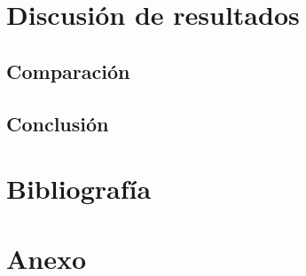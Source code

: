 \documentclass[titlepage]{article}
\begin{document}
\section{Discusión de resultados}
\subsection{Comparación}
\subsection{Conclusión}

\section{Bibliografía}

\section{Anexo}
\end{document}
